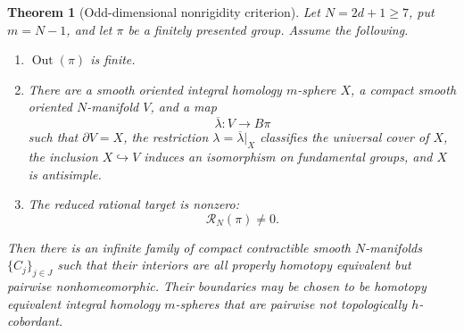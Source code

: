 \documentclass[10pt,reqno]{amsart}
\numberwithin{equation}{section}
\newtheorem{theorem}{Theorem}
\theoremstyle{definition}
\theoremstyle{remark}
\newcommand{\Out}{\operatorname{Out}}
\newcommand{\cR}{\mathcal R}
\begin{document}
\begin{theorem}[Odd-dimensional nonrigidity criterion]
\label{thm:odd-criterion}
Let \(N=2d+1\geq7\), put \(m=N-1\), and let \(\pi\) be a finitely
presented group.  Assume the following.
\begin{enumerate}[label=\textup{(\roman*)}]
\item \(\Out(\pi)\) is finite.

\item There are a smooth oriented integral homology \(m\)-sphere
\(X\), a compact smooth oriented \(N\)-manifold \(V\), and a map
\[
\overline\lambda\colon V\longrightarrow B\pi
\]
such that \(\partial V=X\), the restriction
\(\lambda=\overline\lambda|_X\) classifies the universal cover of
\(X\), the inclusion \(X\hookrightarrow V\) induces an isomorphism
on fundamental groups, and \(X\) is antisimple.

\item The reduced rational target is nonzero:
\[
\cR_N(\pi)\neq0.
\]
\end{enumerate}
Then there is an infinite family of compact contractible smooth
\(N\)-manifolds \(\{C_j\}_{j\in J}\) such that their interiors are
all properly homotopy equivalent but pairwise nonhomeomorphic.  Their
boundaries may be chosen to be homotopy equivalent integral homology
\(m\)-spheres that are pairwise not topologically
\(h\)-cobordant.
\end{theorem}
\end{document}
